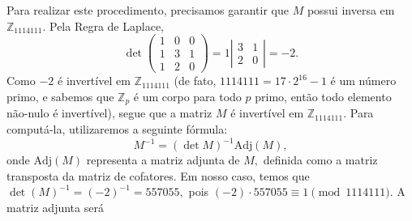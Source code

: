 \documentclass[oneside,a4paper,12pt]{article}
\theoremstyle{definition}
\theoremstyle{plain}
\theoremstyle{solu}
\theoremstyle{dotlessP}
\begin{document}
Para realizar este procedimento, precisamos garantir que $M$ possui inversa em $\mathbb{Z}_{1114111}.$ Pela Regra de Laplace, 
\[
\det \begin{pmatrix}
1 & 0 & 0 \\
1 & 3 & 1 \\
1 & 2 & 0
\end{pmatrix} = 1 \left| \begin{array}{cc} 3 & 1\\ 2 & 0  \end{array} \right| = -2.
\]
Como $-2$ é invertível em $\mathbb{Z}_{1114111}$ (de fato, $1114111 = 17 \cdot 2^{16} - 1$ é um número primo, e sabemos que $\mathbb{Z}_p$ é um corpo para todo $p$ primo, então todo elemento não-nulo é invertível), segue que a matriz $M$ é invertível em $\mathbb{Z}_{1114111}.$ Para computá-la, utilizaremos a seguinte fórmula:
\[
M^{-1} = (\det{M})^{-1} \mathrm{Adj}(M),
\]
onde $\mathrm{Adj}(M)$ representa a matriz adjunta de $M,$ definida como a matriz transposta da matriz de cofatores. Em nosso caso, temos que $\det(M)^{-1} = (-2)^{-1} = 557055,$ pois $(-2) \cdot 557055 \equiv 1 \pmod{1114111}.$ A matriz adjunta será
\end{document}
